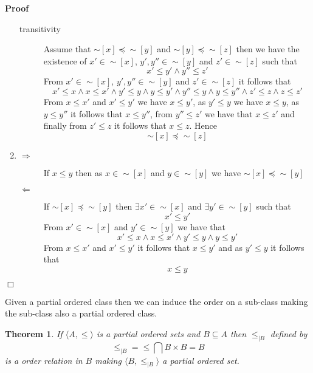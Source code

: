 \documentclass{book}
\newenvironment{proof}{\noindent\textbf{Proof\ }}{\hspace*{\fill}$\Box$\medskip}
\newtheorem{theorem}{Theorem}
\begin{document}
\begin{proof}
\begin{enumerate}
\begin{description}
      \item[transitivity] Assume that $\sim [x] \preccurlyeq \sim [y]$ and
      $\sim [y] \preccurlyeq \sim [z]$ then we have the existence of $x' \in
      \sim [x]$, $y', y'' \in \sim [y]$ and $z' \in \sim [z]$ such that
      \[ x' \leqslant y' \wedge y'' \leqslant z' \]
      From $x' \in \sim [x]$, $y', y'' \in \sim [y]$ and $z' \in \sim [z]$ it
      follows that
      \[ x' \leqslant x \wedge x \leqslant x' \wedge y' \leqslant y \wedge y
         \leqslant y' \wedge y'' \leqslant y \wedge y \leqslant y'' \wedge z'
         \leqslant z \wedge z \leqslant z' \]
      From $x \leqslant x'$ and $x' \leqslant y'$ we have $x \leqslant y'$, as
      $y' \leqslant y$ we have $x \leqslant y$, as $y \leqslant y''$ it
      follows that $x \leqslant y''$, from $y'' \leqslant z'$ we have that $x
      \leqslant z'$ and finally from $z' \leqslant z$ it follows that $x
      \leqslant z$. Hence
      \[ \sim [x] \preccurlyeq \sim [z] \]
    \end{description}
    \item 
    \begin{description}
      \item[$\Rightarrow$] If $x \leqslant y$ then as $x \in \sim [x]$ and $y
      \in \sim [y]$ we have $\sim [x] \preccurlyeq \sim [y]$
      
      \item[$\Leftarrow$] If $\sim [x] \preccurlyeq \sim [y]$ then $\exists x'
      \in \sim [x]$ and $\exists y' \in \sim [y]$ such that
      \[ x' \leqslant y' \]
      From $x' \in \sim [x]$ and $y' \in \sim [y]$ we have that
      \[ x' \leqslant x \wedge x \leqslant x' \wedge y' \leqslant y \wedge y
         \leqslant y' \]
      From $x \leqslant x'$ and $x' \leqslant y'$ it follows that $x \leqslant
      y'$ and as $y' \leqslant y$ it follows that
      \[ x \leqslant y \]
    \end{description}
  \end{enumerate}
\end{proof}

Given a partial ordered class then we can induce the order on a sub-class
making the sub-class also a partial ordered class.

\begin{theorem}
  \label{order partial order on sub class}If $\langle A, \leqslant \rangle$ is
  a partial ordered sets and $B \subseteq A$ then $\leqslant_{|B}$ defined by
  \[ \leqslant_{|B} = \leqslant \bigcap B \times B = B \]
  is a order relation in $B$ making $\langle B, \leqslant_{|B} \rangle$ a
  partial ordered set.\quad
\end{theorem}
\end{document}
